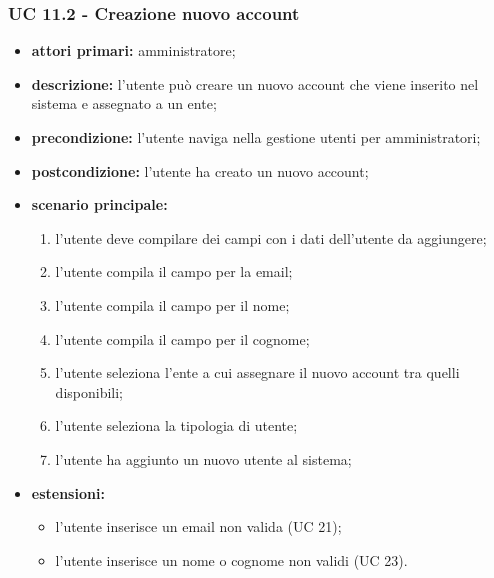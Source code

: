 			\subsubsection{UC 11.2 - Creazione nuovo account}
			\begin{itemize}
				\item \textbf{attori primari:} amministratore;
				\item \textbf{descrizione:} l'utente può creare un nuovo account che viene inserito nel sistema e assegnato a un ente;
				\item \textbf{precondizione:} l'utente naviga nella gestione utenti per amministratori;
				\item \textbf{postcondizione:} l'utente ha creato un nuovo account;
				\item \textbf{scenario principale:}
				\begin{enumerate}
					\item{l'utente deve compilare dei campi con i dati dell'utente da aggiungere;}
					\item{l'utente compila il campo per la email;}
					\item{l'utente compila il campo per il nome;}
					\item{l'utente compila il campo per il cognome;}
					\item{l'utente seleziona l'ente a cui assegnare il nuovo account tra quelli disponibili;}
					\item{l'utente seleziona la tipologia di utente;}
					\item{l'utente ha aggiunto un nuovo utente al sistema;}
				\end{enumerate}
				\item \textbf{estensioni:}
				\begin{itemize}
					\item l'utente inserisce un email non valida (UC 21);
					\item l'utente inserisce un nome o cognome non validi (UC 23).
				\end{itemize}
			\end{itemize}

